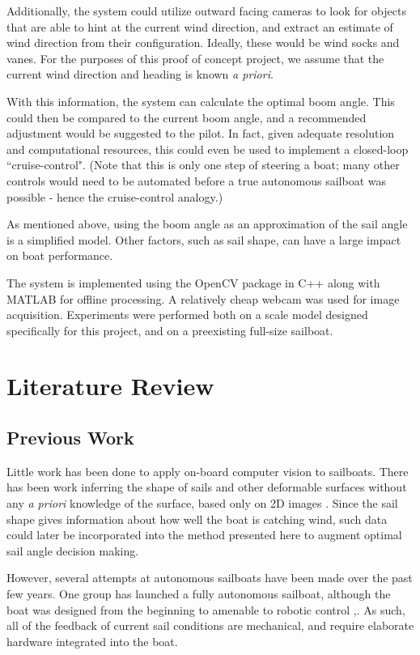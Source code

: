 \documentclass[letterpaper, 10 pt, conference]{ieeeconf}  %
\begin{document}
Additionally, the system could utilize outward facing cameras to look for objects that are able to hint at the current wind direction, and extract an estimate of wind direction from their configuration. Ideally, these would be wind socks and vanes. For the purposes of this proof of concept project, we assume that the current wind direction and heading is known \emph{a priori}.

With this information, the system can calculate the optimal boom angle. This could then be compared to the current boom angle, and a recommended adjustment would be suggested to the pilot. In fact, given adequate resolution and computational resources, this could even be used to implement a closed-loop ``cruise-control". (Note that this is only one step of steering a boat; many other controls would need to be automated before a true autonomous sailboat was possible - hence the cruise-control analogy.)

As mentioned above, using the boom angle as an approximation of the sail angle is a simplified model. Other factors, such as sail shape, can have a large impact on boat performance.

The system is implemented using the OpenCV package in C++ along with MATLAB for offline processing. A relatively cheap webcam was used for image acquisition. Experiments were performed both on a scale model designed specifically for this project, and on a preexisting full-size sailboat. 

\section{Literature Review}
\subsection{Previous Work}
Little work has been done to apply on-board computer vision to sailboats. There has been work inferring the shape of sails and other deformable surfaces without any \emph{a priori} knowledge of the surface, based only on 2D images \cite{Pilet:2008}. Since the sail shape gives information about how well the boat is catching wind, such data could later be incorporated into the method presented here to augment optimal sail angle decision making. 
 
However, several attempts at autonomous sailboats have been made over the past few years. One group has launched a fully autonomous sailboat, although the boat was designed from the beginning to amenable to robotic control \cite{Stelzer:2011},\cite{Sauz:2013}. As such, all of the feedback of current sail conditions are mechanical, and require elaborate hardware integrated into the boat. 
\end{document}
